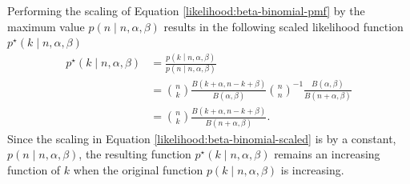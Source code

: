 \documentclass[officiallayout]{tktla}
\begin{document}
Performing the scaling of Equation \ref{likelihood:beta-binomial-pmf}
by the maximum value $p\left(n \middle| n, \alpha, \beta\right)$
results in the following scaled likelihood function $p^{\star}\left(k
\middle| n, \alpha, \beta\right)$
\begin{equation}
  \label{likelihood:beta-binomial-scaled}
  \begin{aligned}
    p^{\star}\left(k \middle| n, \alpha, \beta\right) &= \frac{p\left(k \middle| n, \alpha, \beta\right)}{p\left(n \middle| n, \alpha, \beta\right)} \\
    &= \binom{n}{k}\frac{B\left(k + \alpha, n - k + \beta\right)}{B\left(\alpha, \beta\right)} \binom{n}{n}^{-1}\frac{B\left(\alpha, \beta\right)}{B\left(n + \alpha, \beta\right)} \\
    &= \binom{n}{k}\frac{B\left(k + \alpha, n - k + \beta\right)}{B\left(n + \alpha, \beta\right)}.
  \end{aligned}
\end{equation}
Since the scaling in Equation \ref{likelihood:beta-binomial-scaled} is
by a constant, $p\left(n \middle| n, \alpha, \beta\right)$, the
resulting function $p^{\star}\left(k \middle| n, \alpha, \beta\right)$
remains an increasing function of $k$ when the original function
$p\left(k \middle| n, \alpha, \beta\right)$ is increasing.

\end{document}
